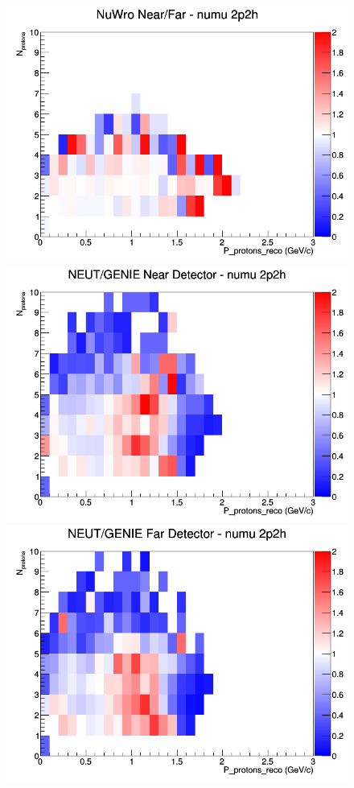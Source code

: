 \begin{figure}[h]
\endminipage
{}
\includegraphics[width=\linewidth]{eff_N_P/LAr/protons/ratios/2p2h_NuWro_numu_NF_N_P.png}
\endminipage
\newline
{}
\includegraphics[width=\linewidth]{eff_N_P/LAr/protons/ratios/2p2h_NEUT_GENIE_numu_near_N_P.png}
\endminipage
{}
\includegraphics[width=\linewidth]{eff_N_P/LAr/protons/ratios/2p2h_NEUT_GENIE_numu_far_N_P.png}

\end{figure}
